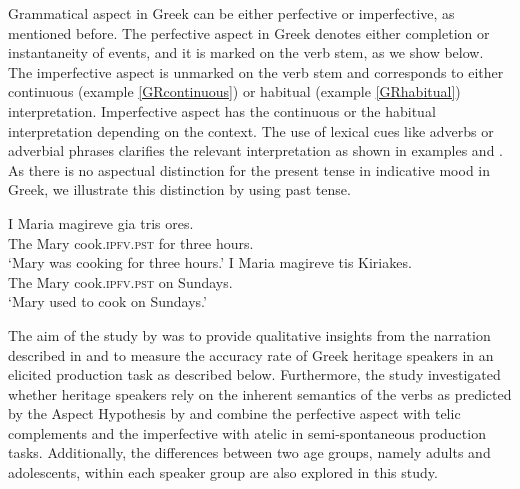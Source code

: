\documentclass[output=paper,colorlinks,citecolor=brown]{langscibook}
\begin{document}
Grammatical aspect in Greek can be either perfective or imperfective, as mentioned before. The perfective aspect in Greek denotes either completion or instantaneity of events, and it is marked on the verb stem, as we show below. The imperfective aspect is unmarked on the verb stem and corresponds to either continuous (example \ref{GRcontinuous}) or habitual (example \ref{GRhabitual}) interpretation. Imperfective aspect has the continuous or the habitual interpretation depending on the context. The use of lexical cues like adverbs or adverbial phrases clarifies the relevant interpretation as shown in examples  and  \parencite{moser1994interaction}. As there is no aspectual distinction for the present tense in indicative mood in Greek, we illustrate this distinction by using past tense. 

\ea \label{GRcontinuous}
\gll I Maria magireve gia tris ores.\\
	The Mary cook.\textsc{ipfv.pst} for three hours.\\
\glt `Mary was cooking for three hours.'
\ex \label{GRhabitual}
\gll I Maria magireve tis Kiriakes.\\ 
	The Mary cook.\textsc{ipfv.pst} on Sundays.\\
\glt `Mary used to cook on Sundays.'
\z
{}

The aim of the study by \textcite{rizou2021verbal} was to provide qualitative insights from the narration described in  and to measure the accuracy rate of Greek heritage speakers in an elicited production task as described below. Furthermore, the study investigated whether heritage speakers rely on the inherent semantics of the verbs as predicted by the Aspect Hypothesis by \textcite{andersen1994discourse} and combine the perfective aspect with telic complements and the imperfective with atelic in semi-spontaneous production tasks. Additionally, the differences between two age groups, namely adults and adolescents, within each speaker group are also explored in this study. 
\end{document}
